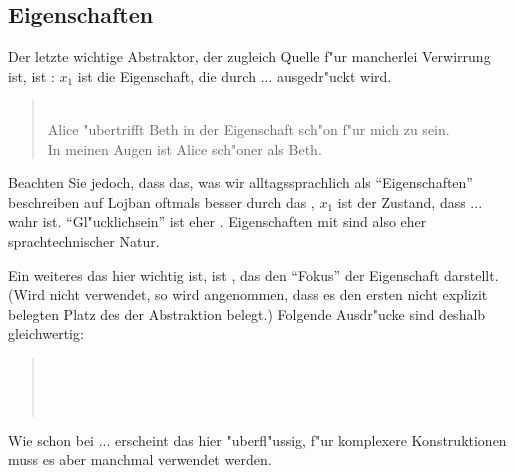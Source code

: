 \subsection{Eigenschaften}
Der letzte wichtige Abstraktor, der zugleich Quelle f"ur mancherlei Verwirrung ist, ist : $x_1$ ist die Eigenschaft, die durch ...
ausgedr"uckt wird.
\begin{quote}
 \\
Alice "ubertrifft Beth in der Eigenschaft sch"on f"ur mich zu sein. \\
In meinen Augen ist Alice sch"oner als Beth.
\end{quote}

Beachten Sie jedoch, dass das, was wir alltagssprachlich als ``Eigenschaften'' beschreiben auf Lojban oftmals besser durch das , $x_1$
ist der Zustand, dass ... wahr ist. ``Gl"ucklichsein'' ist eher .
Eigenschaften mit  sind also eher sprachtechnischer Natur.

Ein weiteres  das hier wichtig ist, ist , das den ``Fokus'' der Eigenschaft darstellt. (Wird  nicht verwendet, so wird
angenommen, dass es den ersten nicht explizit belegten Platz des  der Abstraktion belegt.) Folgende Ausdr"ucke sind deshalb gleichwertig:
\begin{quote}
 \\
\\
 \\
\end{quote}

Wie schon bei ... erscheint das  hier "uberfl"ussig, f"ur komplexere Konstruktionen muss es aber manchmal verwendet werden.

